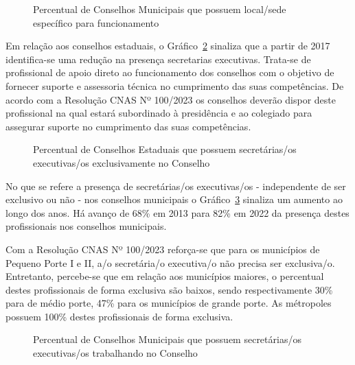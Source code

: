 \documentclass[
  letterpaper,
  DIV=11,
  numbers=noendperiod]{scrreprt}
\begin{document}
\begin{figure}


\caption{\label{fig-cmas_sede}Percentual de Conselhos Municipais que
possuem local/sede específico para funcionamento}

\end{figure}%

Em relação aos conselhos estaduais, o Gráfico~\ref{fig-ceas_se} sinaliza
que a partir de 2017 identifica-se uma redução na presença secretarias
executivas. Trata-se de profissional de apoio direto ao funcionamento
dos conselhos com o objetivo de fornecer suporte e assessoria técnica no
cumprimento das suas competências. De acordo com a Resolução CNAS Nº
100/2023 os conselhos deverão dispor deste profissional na qual estará
subordinado à presidência e ao colegiado para assegurar suporte no
cumprimento das suas competências.

\begin{figure}


\caption{\label{fig-ceas_se}Percentual de Conselhos Estaduais que
possuem secretárias/os executivas/os exclusivamente no Conselho}

\end{figure}%

No que se refere a presença de secretárias/os executivas/os -
independente de ser exclusivo ou não - nos conselhos municipais o
Gráfico~\ref{fig-cmas_se} sinaliza um aumento ao longo dos anos. Há
avanço de 68\% em 2013 para 82\% em 2022 da presença destes
profissionais nos conselhos municipais.

Com a Resolução CNAS Nº 100/2023 reforça-se que para os municípios de
Pequeno Porte I e II, a/o secretária/o executiva/o não precisa ser
exclusiva/o. Entretanto, percebe-se que em relação aos municípios
maiores, o percentual destes profissionais de forma exclusiva são
baixos, sendo respectivamente 30\% para de médio porte, 47\% para os
municípios de grande porte. As métropoles possuem 100\% destes
profissionais de forma exclusiva.

\begin{figure}


\caption{\label{fig-cmas_se}Percentual de Conselhos Municipais que
possuem secretárias/os executivas/os trabalhando no Conselho}

\end{figure}%
\end{document}
